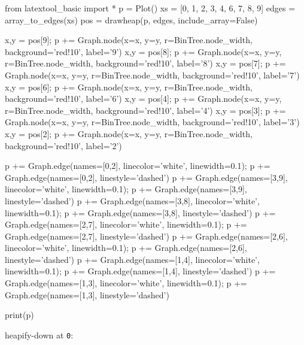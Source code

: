 \begin{python}
from latextool_basic import *
p = Plot()
xs = [0, 1, 2, 3, 4, 6, 7, 8, 9]
edges = array_to_edges(xs)
pos = drawheap(p, edges, include_array=False)

x,y = pos[9]; p += Graph.node(x=x, y=y, r=BinTree.node_width, background='red!10', label='9')
x,y = pos[8]; p += Graph.node(x=x, y=y, r=BinTree.node_width, background='red!10', label='8')
x,y = pos[7]; p += Graph.node(x=x, y=y, r=BinTree.node_width, background='red!10', label='7')
x,y = pos[6]; p += Graph.node(x=x, y=y, r=BinTree.node_width, background='red!10', label='6')
x,y = pos[4]; p += Graph.node(x=x, y=y, r=BinTree.node_width, background='red!10', label='4')
x,y = pos[3]; p += Graph.node(x=x, y=y, r=BinTree.node_width, background='red!10', label='3')
x,y = pos[2]; p += Graph.node(x=x, y=y, r=BinTree.node_width, background='red!10', label='2')

p += Graph.edge(names=[0,2], linecolor='white', linewidth=0.1); p += Graph.edge(names=[0,2], linestyle='dashed')
p += Graph.edge(names=[3,9], linecolor='white', linewidth=0.1); p += Graph.edge(names=[3,9], linestyle='dashed')
p += Graph.edge(names=[3,8], linecolor='white', linewidth=0.1); p += Graph.edge(names=[3,8], linestyle='dashed')
p += Graph.edge(names=[2,7], linecolor='white', linewidth=0.1); p += Graph.edge(names=[2,7], linestyle='dashed')
p += Graph.edge(names=[2,6], linecolor='white', linewidth=0.1); p += Graph.edge(names=[2,6], linestyle='dashed')
p += Graph.edge(names=[1,4], linecolor='white', linewidth=0.1); p += Graph.edge(names=[1,4], linestyle='dashed')
p += Graph.edge(names=[1,3], linecolor='white', linewidth=0.1); p += Graph.edge(names=[1,3], linestyle='dashed')

print(p)
\end{python}

heapify-down at \texttt{0}:

